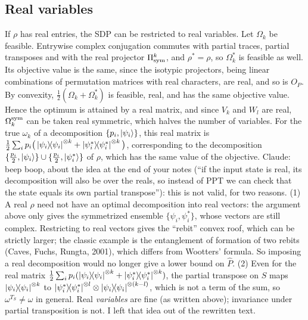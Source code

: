 \documentclass[aps,pra,twocolumn,showpacs,superscriptaddress,groupedaddress]{revtex4-2}
\newcommand{\claude}[1]{{\color{claudeorange} Claude: beep boop, #1}}
\begin{document}
\begin{widetext}
\subsection{Real variables}
If $\rho$ has real entries, the SDP can be restricted to real variables. Let $\Omega_k$ be feasible. Entrywise complex conjugation commutes with partial traces, partial transposes and with the real projector $\Pi_{\rm sym}^{k}$, and $\rho^*=\rho$, so $\Omega_k^*$ is feasible as well. Its objective value is the same, since the isotypic projectors, being linear combinations of permutation matrices with real characters, are real, and so is $O_P$. By convexity, $\frac12(\Omega_k+\Omega_k^*)$ is feasible, real, and has the same objective value. Hence the optimum is attained by a real matrix, and since $V_k$ and $W_l$ are real, $\Omega_k^{\rm sym}$ can be taken real symmetric, which halves the number of variables. For the true $\omega_k$ of a decomposition $\{p_i,\ket{\psi_i}\}$, this real matrix is $\frac12\sum_ip_i\big(\dyad{\psi_i}^{\otimes k}+\dyad{\psi_i^*}^{\otimes k}\big)$, corresponding to the decomposition $\{\frac{p_i}{2},\ket{\psi_i}\}\cup\{\frac{p_i}{2},\ket{\psi_i^*}\}$ of $\rho$, which has the same value of the objective.
\claude{about the idea at the end of your notes (``if the input state is real, its decomposition will also be over the reals, so instead of PPT we can check that the state equals its own partial transpose''): this is not valid, for two reasons. (1) A real $\rho$ need not have an optimal decomposition into real vectors: the argument above only gives the symmetrized ensemble $\{\psi_i,\psi_i^*\}$, whose vectors are still complex. Restricting to real vectors gives the ``rebit'' convex roof, which can be strictly larger; the classic example is the entanglement of formation of two rebits (Caves, Fuchs, Rungta, 2001), which differs from Wootters' formula. So imposing a real decomposition would no longer give a lower bound on $\widehat P$. (2) Even for the real matrix $\frac12\sum_ip_i(\dyad{\psi_i}^{\otimes k}+\dyad{\psi_i^*}^{\otimes k})$, the partial transpose on $S$ maps $\dyad{\psi_i}^{\otimes k}$ to $\dyad{\psi_i^*}^{\otimes l}\otimes\dyad{\psi_i}^{\otimes(k-l)}$, which is not a term of the sum, so $\omega^{T_S}\neq\omega$ in general. Real \emph{variables} are fine (as written above); invariance under partial transposition is not. I left that idea out of the rewritten text.}


\end{widetext}
\end{document}
